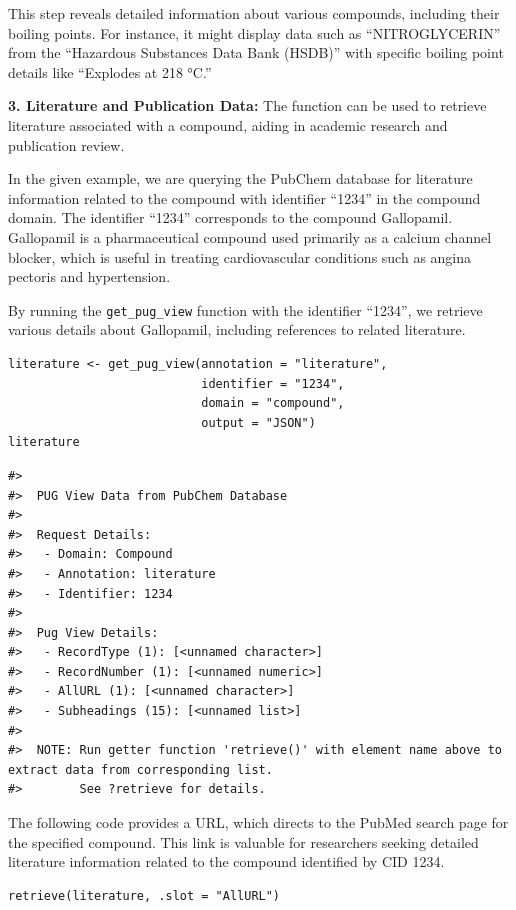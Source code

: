 This step reveals detailed information about various compounds, including their boiling points. For instance, it might display data such as ``NITROGLYCERIN'' from the ``Hazardous Substances Data Bank (HSDB)'' with specific boiling point details like ``Explodes at 218 °C.''

\textbf{3. Literature and Publication Data:} The function can be used to retrieve literature associated with a compound, aiding in academic research and publication review.

In the given example, we are querying the PubChem database for literature information related to the compound with identifier ``1234'' in the compound domain. The identifier ``1234'' corresponds to the compound Gallopamil. Gallopamil is a pharmaceutical compound used primarily as a calcium channel blocker, which is useful in treating cardiovascular conditions such as angina pectoris and hypertension.

By running the \texttt{get\_pug\_view} function with the identifier ``1234'', we retrieve various details about Gallopamil, including references to related literature.

\begin{verbatim}
literature <- get_pug_view(annotation = "literature", 
                           identifier = "1234", 
                           domain = "compound", 
                           output = "JSON")
literature
\end{verbatim}

\begin{verbatim}
#> 
#>  PUG View Data from PubChem Database 
#> 
#>  Request Details:  
#>   - Domain: Compound
#>   - Annotation: literature
#>   - Identifier: 1234
#> 
#>  Pug View Details: 
#>   - RecordType (1): [<unnamed character>] 
#>   - RecordNumber (1): [<unnamed numeric>] 
#>   - AllURL (1): [<unnamed character>] 
#>   - Subheadings (15): [<unnamed list>] 
#> 
#>  NOTE: Run getter function 'retrieve()' with element name above to extract data from corresponding list. 
#>        See ?retrieve for details.
\end{verbatim}

The following code provides a URL, which directs to the PubMed search page for the specified compound. This link is valuable for researchers seeking detailed literature information related to the compound identified by CID 1234.

\begin{verbatim}
retrieve(literature, .slot = "AllURL")
\end{verbatim}

